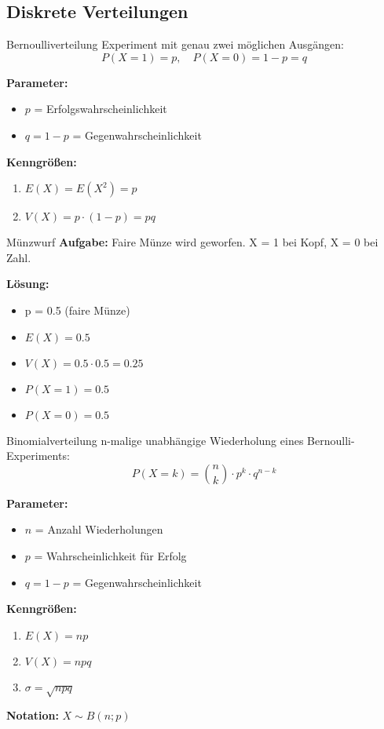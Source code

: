 \subsection{Diskrete Verteilungen}

\begin{definition}{Bernoulliverteilung}
Experiment mit genau zwei möglichen Ausgängen:
$$
P(X=1)=p, \quad P(X=0)=1-p=q
$$

\textbf{Parameter:}
\begin{itemize}
    \item $p$ = Erfolgswahrscheinlichkeit
    \item $q = 1-p$ = Gegenwahrscheinlichkeit
\end{itemize}

\textbf{Kenngrößen:}
\begin{enumerate}
    \item $E(X)=E(X^2)=p$
    \item $V(X)=p \cdot(1-p)=pq$
\end{enumerate}
\end{definition}

\begin{example}{Münzwurf}
\textbf{Aufgabe:} Faire Münze wird geworfen. X = 1 bei Kopf, X = 0 bei Zahl.

\textbf{Lösung:}
\begin{itemize}
\item p = 0.5 (faire Münze)
\item $E(X) = 0.5$
\item $V(X) = 0.5 \cdot 0.5 = 0.25$
\item $P(X=1) = 0.5$
\item $P(X=0) = 0.5$
\end{itemize}
\end{example}

\begin{definition}{Binomialverteilung}
n-malige unabhängige Wiederholung eines Bernoulli-Experiments:
$$P(X=k) = \binom{n}{k} \cdot p^k \cdot q^{n-k}$$

\textbf{Parameter:}
\begin{itemize}
    \item $n$ = Anzahl Wiederholungen
    \item $p$ = Wahrscheinlichkeit für Erfolg
    \item $q = 1-p$ = Gegenwahrscheinlichkeit
\end{itemize}

\textbf{Kenngrößen:}
\begin{enumerate}
    \item $E(X) = np$
    \item $V(X) = npq$
    \item $\sigma = \sqrt{npq}$
\end{enumerate}

\textbf{Notation:} $X \sim B(n;p)$
\end{definition}

